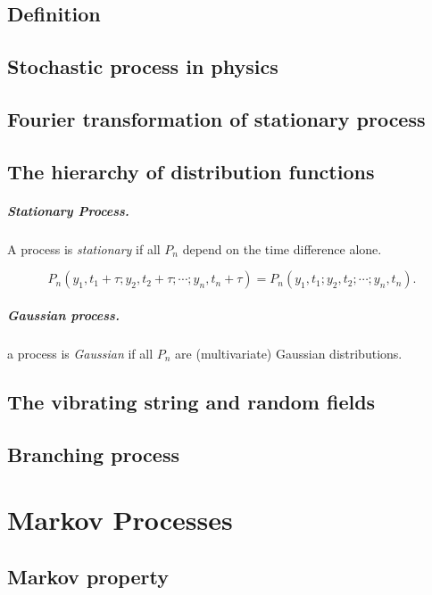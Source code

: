 \documentclass{book}
\theoremstyle{plain}
\theoremstyle{definition}
\theoremstyle{remark}
\begin{document}
\section{Definition}

\section{Stochastic process in physics}

\section{Fourier transformation of stationary process}

\section{The hierarchy of distribution functions}

\paragraph{Stationary Process.}

A process is \emph{stationary} if all $P_n$ depend on the time difference alone.

$$
P_n(y_1, t_1 + \tau; y_2, t_2 + \tau; \cdots; y_n, t_n + \tau)
=
P_n(y_1, t_1; y_2, t_2; \cdots; y_n, t_n).
$$


\paragraph{Gaussian process.}

a process is \emph{Gaussian} if all $P_n$ are
(multivariate) Gaussian distributions.


\section{The vibrating string and random fields}

\section{Branching process}


\chapter{Markov Processes}


\section{Markov property}
\end{document}
